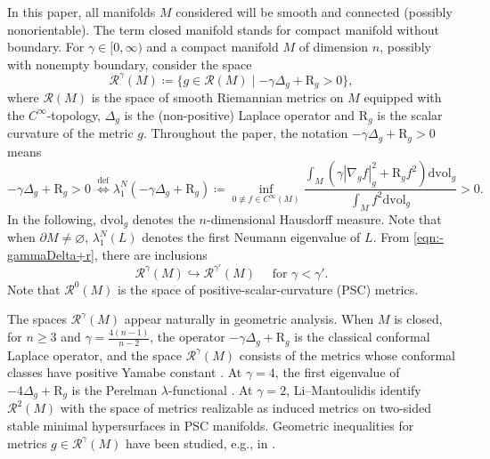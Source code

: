 \documentclass[11pt]{amsart}
\numberwithin{equation}{section}
\newcommand{\Riem}{\mathcal{R}}
\newcommand{\scal}{\mathrm{R}}
\newcommand{\embeds}{\hookrightarrow}
\newcommand{\dvol}{\mathrm{dvol}}
\let\geq\geqslant
\begin{document}
\noindent In this paper, all manifolds $M$ considered will be smooth and connected (possibly nonorientable). 
The term closed manifold stands for compact manifold without boundary. 
For $\gamma\in[0,\infty)$ and a compact manifold $M$ of dimension $n$, possibly with nonempty boundary, consider the space
\begin{equation}\label{eq:def-r-gamma}
  \Riem^{\gamma}(M)\coloneqq\{g\in\Riem(M)\mid  -\gamma\Delta_g + \scal_{g}>0\},
\end{equation}
where $\Riem(M)$ is the space of smooth Riemannian metrics on $M$ equipped with the $C^\infty$-topology, $\Delta_g$ is the (non-positive) Laplace operator and $\scal_{g}$ is the scalar curvature of the metric $g$. 
Throughout the paper, the notation $-\gamma\Delta_g+\scal_g>0$ means
\begin{equation}\label{eqn:-gammaDelta+r}
-\gamma\Delta_g+\scal_{g}>0\  \stackrel{\mathrm{def}}{\Longleftrightarrow}  \lambda_1^N(-\gamma\Delta_g+\scal_g)\coloneqq \inf_{0\not\equiv f\in C^\infty(M)}\frac{\int_M \left(\gamma|\nabla_g f|_g^2 + \scal_g f^2\right)\dvol_g}{\int_M f^2\dvol_g} >0.
\end{equation}
In the following, $\dvol_g$ denotes the $n$-dimensional Hausdorff measure. Note that when $\partial M\neq\varnothing$, $\lambda_1^N(L)$ denotes the first Neumann eigenvalue of $L$. From \eqref{eqn:-gammaDelta+r}, there are inclusions
\begin{equation}\label{eq:inclusion-of-R-gamma}
\Riem^{\gamma}(M)\embeds\Riem^{\gamma'}(M) \quad \textrm{ for } \gamma < \gamma' .
\end{equation}
Note that $\Riem^0(M)$ is the space of positive-scalar-curvature (PSC) metrics.

The spaces $\mathcal{R}^\gamma(M)$ appear naturally in geometric analysis. When $M$ is closed, for $n \geq 3$ and  $\gamma = \frac{4(n-1)}{n-2}$, the operator $- \gamma \Delta_g + \scal_g$ is the classical conformal Laplace operator, and the space $\Riem^{\gamma}(M)$ consists of the metrics whose conformal classes have positive Yamabe constant \cite{KazdanWarner}. At $\gamma=4$, the first eigenvalue of $-4\Delta_g+\scal_g$ is the Perelman
$\lambda$-functional \cite{PerelmanEntropy}. At $\gamma=2$, Li--Mantoulidis \cite[Lemma C.6]{LiMantoulidis2023}
identify $\mathcal R^2(M)$ with the space of metrics realizable as
induced metrics on two-sided stable minimal hypersurfaces in PSC
manifolds. Geometric inequalities for metrics $g\in \mathcal{R}^\gamma(M)$ have been studied, e.g., in \cite{HirschKazarasKhuriZhang}.
\end{document}
